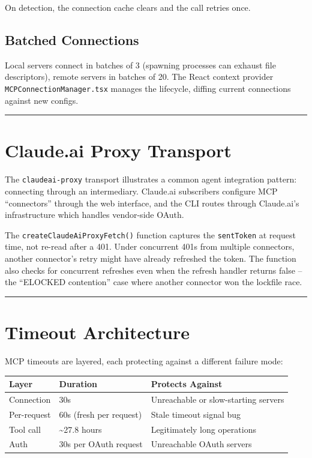 \documentclass[
  english,
  11pt,
  letterpaper,
]{book}
\begin{document}
On detection, the connection cache clears and the call retries once.

\subsection{Batched Connections}\label{batched-connections}

Local servers connect in batches of 3 (spawning processes can exhaust
file descriptors), remote servers in batches of 20. The React context
provider \texttt{MCPConnectionManager.tsx} manages the lifecycle,
diffing current connections against new configs.

\begin{center}\rule{0.5\linewidth}{0.5pt}\end{center}

\section{Claude.ai Proxy Transport}\label{claude.ai-proxy-transport}

The \texttt{claudeai-proxy} transport illustrates a common agent
integration pattern: connecting through an intermediary. Claude.ai
subscribers configure MCP ``connectors'' through the web interface, and
the CLI routes through Claude.ai's infrastructure which handles
vendor-side OAuth.

The \texttt{createClaudeAiProxyFetch()} function captures the
\texttt{sentToken} at request time, not re-read after a 401. Under
concurrent 401s from multiple connectors, another connector's retry
might have already refreshed the token. The function also checks for
concurrent refreshes even when the refresh handler returns false -- the
``ELOCKED contention'' case where another connector won the lockfile
race.

\begin{center}\rule{0.5\linewidth}{0.5pt}\end{center}

\section{Timeout Architecture}\label{timeout-architecture}

MCP timeouts are layered, each protecting against a different failure
mode:

\begin{longtable}[]{@{}lll@{}}
\toprule\noalign{}
Layer & Duration & Protects Against \\
\midrule\noalign{}
\endhead
\bottomrule\noalign{}
\endlastfoot
Connection & 30s & Unreachable or slow-starting servers \\
Per-request & 60s (fresh per request) & Stale timeout signal bug \\
Tool call & \textasciitilde27.8 hours & Legitimately long operations \\
Auth & 30s per OAuth request & Unreachable OAuth servers \\
\end{longtable}
\end{document}
